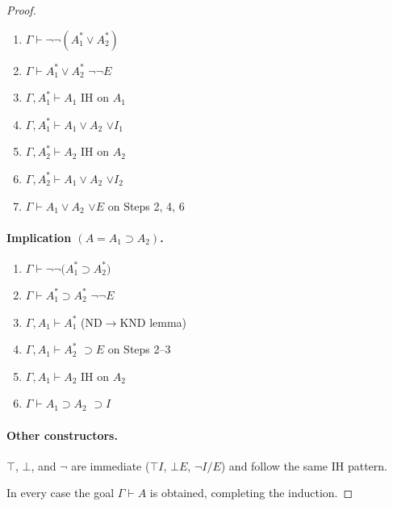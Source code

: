 \documentclass{article}
\begin{document}
\begin{proof}
    \begin{enumerate}[leftmargin=1.5em,labelsep=.5em,label={\textbf{Step~\arabic*:}}]
      \item \(\Gamma \vdash \neg\neg(A_{1}^{*}\lor A_{2}^{*})\)
      \item \(\Gamma \vdash A_{1}^{*}\lor A_{2}^{*}\) \hfill \(\neg\neg E\)
      \item \(\Gamma, A_{1}^{*} \vdash A_{1}\) \hfill IH on \(A_{1}\)
      \item \(\Gamma, A_{1}^{*} \vdash A_{1}\lor A_{2}\) \hfill \(\lor I_{1}\)
      \item \(\Gamma, A_{2}^{*} \vdash A_{2}\) \hfill IH on \(A_{2}\)
      \item \(\Gamma, A_{2}^{*} \vdash A_{1}\lor A_{2}\) \hfill \(\lor I_{2}\)
      \item \(\Gamma \vdash A_{1}\lor A_{2}\) \hfill \(\lor E\) on Steps 2, 4, 6
    \end{enumerate}
    
    \paragraph{Implication \boldmath$(A = A_{1}\supset A_{2})$.}
    
    \begin{enumerate}[leftmargin=1.5em,labelsep=.5em,label={\textbf{Step~\arabic*:}}]
      \item \(\Gamma \vdash \neg\neg\bigl(A_{1}^{*}\supset A_{2}^{*}\bigr)\)
      \item \(\Gamma \vdash A_{1}^{*}\supset A_{2}^{*}\) \hfill \(\neg\neg E\)
      \item \(\Gamma , A_{1} \vdash A_{1}^{*}\) \hfill (ND\(\to\)KND lemma)
      \item \(\Gamma , A_{1} \vdash A_{2}^{*}\) \hfill \(\supset E\) on Steps 2–3
      \item \(\Gamma , A_{1} \vdash A_{2}\) \hfill IH on \(A_{2}\)
      \item \(\Gamma \vdash A_{1}\supset A_{2}\) \hfill \(\supset I\)
    \end{enumerate}
    
    \paragraph{Other constructors.}
    \(\top\), \(\bot\), and \(\neg\) are immediate
    (\(\top\!I\), \(\bot\!E\), \(\neg I/E\)) and follow the same IH pattern.
    
    \bigskip
    In every case the goal \(\Gamma\vdash A\) is obtained, completing the induction.
    \end{proof}
\end{document}
